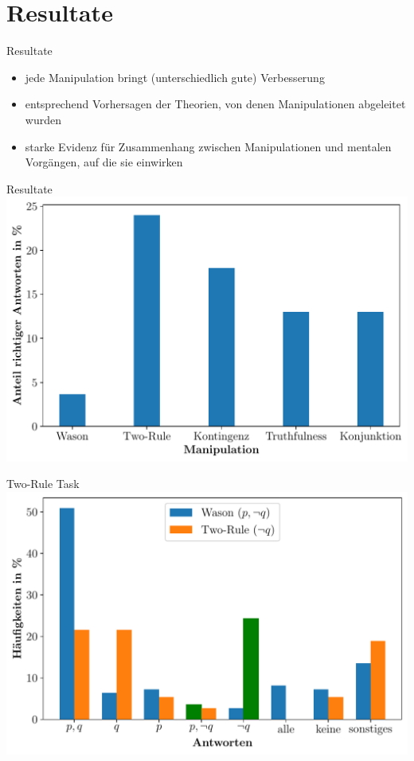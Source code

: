 
\section{Resultate}

\begin{frame}{Resultate {\scriptsize \cite[S.~101-102]{stenningHumanReasoningCognitive2008}}}
    \begin{itemize}
        \item jede Manipulation bringt (unterschiedlich gute) Verbesserung
        \item entsprechend Vorhersagen der Theorien, von denen Manipulationen abgeleitet wurden
        \item starke Evidenz für Zusammenhang zwischen Manipulationen und mentalen Vorgängen, auf die sie einwirken
    \end{itemize}
\end{frame}


\begin{frame}{Resultate {\scriptsize \cite[S.~101]{stenningHumanReasoningCognitive2008}}}
    \includegraphics[width=\textwidth]{../plot/results_correct.pdf}
\end{frame}


\begin{frame}{Two-Rule Task {\scriptsize \cite[S.~109]{stenningHumanReasoningCognitive2008}}}
    \includegraphics[width=\textwidth]{../plot/results_two_rule.pdf}
\end{frame}


